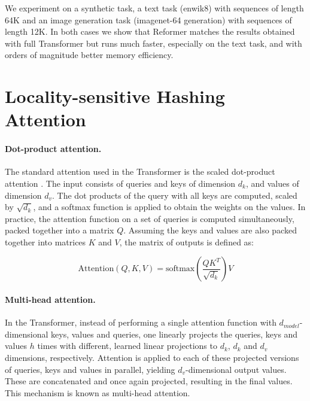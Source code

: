We experiment on a synthetic task, a text task (enwik8) with sequences of length 64K and an image generation task (imagenet-64 generation)
with sequences of length 12K. In both cases we show that Reformer matches the results obtained with full Transformer
but runs much faster, especially on the text task, and with orders of magnitude better memory efficiency.

\section{Locality-sensitive Hashing Attention}

\paragraph{Dot-product attention.}
The standard attention used in the Transformer is the scaled dot-product attention \citep{transformer}. 
The input consists of queries and keys of dimension $d_k$, and values of dimension $d_v$.  
The dot products of the query with all keys are computed, scaled by $\sqrt{d_k}$, and a softmax function is 
applied to obtain the weights on the values. In practice, the attention function on a set of queries is computed 
simultaneously, packed together into a matrix $Q$.  Assuming the keys and values are also packed together into 
matrices $K$ and $V$, the matrix of outputs is defined as:

\begin{equation}\label{eq:attn}
   \mathrm{Attention}(Q, K, V) = \mathrm{softmax}(\frac{QK^T}{\sqrt{d_k}})V
\end{equation}

\paragraph{Multi-head attention.}
In the Transformer, instead of performing a single attention function with $d_{model}$-dimensional keys, 
values and queries, one linearly projects the queries, keys and values $h$ times with different, 
learned linear projections to $d_k$, $d_k$ and $d_v$ dimensions, respectively.  Attention is applied to 
each of these projected versions of queries, keys and values in parallel, yielding $d_v$-dimensional 
output values. These are concatenated and once again projected, resulting in the final values. This 
mechanism is known as multi-head attention.

